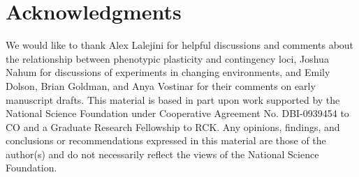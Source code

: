 \documentclass[10pt,letterpaper,final]{article}
\begin{document}
\section*{Acknowledgments}
We would like to thank Alex Lalejini for helpful discussions and comments about the relationship between phenotypic plasticity and contingency loci, Joshua Nahum for discussions of experiments in changing environments, and Emily Dolson, Brian Goldman, and Anya Vostinar for their comments on early manuscript drafts.
This material is based in part upon work supported by the National Science Foundation under Cooperative Agreement No. DBI-0939454 to CO and a Graduate Research Fellowship to RCK. Any opinions, findings, and conclusions or recommendations expressed in this material are those of the author(s) and do not necessarily reflect the views of the National Science Foundation.

%

\end{document}
